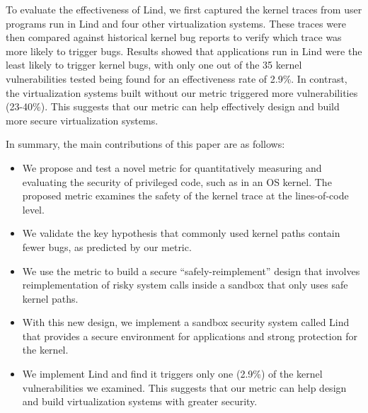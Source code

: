 To evaluate the effectiveness of Lind, we first captured the
kernel traces from user programs run in Lind and four other virtualization
systems.
These traces were then compared against historical
kernel bug reports to verify which trace was more likely to trigger bugs.
Results showed that applications run in Lind were the least likely to
trigger kernel bugs, with only one out of the 35 kernel vulnerabilities tested
being found for an effectiveness rate of 2.9\%. In contrast, the virtualization
systems built without our metric triggered more vulnerabilities (23-40\%). This
suggests that our metric can help effectively design and build more secure
virtualization systems.

In summary,  the main contributions of this paper are as follows: %
\begin{itemize}
\item We propose and test a novel metric for quantitatively measuring and
evaluating the security of privileged code, such as in an OS kernel.
The proposed metric examines the safety of the kernel trace at the lines-of-code
level.
\item We validate the key hypothesis that commonly used kernel paths contain
fewer bugs, as predicted by our metric.

\item We use the metric to build a secure ``safely-reimplement'' design that
involves reimplementation of risky system calls inside a
sandbox that only uses safe kernel paths.

\item With this new design, we implement a sandbox security system called Lind
that provides a secure environment for applications and strong protection for
the kernel.
\item We implement Lind and find 
it triggers only one (2.9\%) of the kernel vulnerabilities we examined. This
suggests that our metric can help design and build virtualization systems
with greater security.
\end{itemize}


